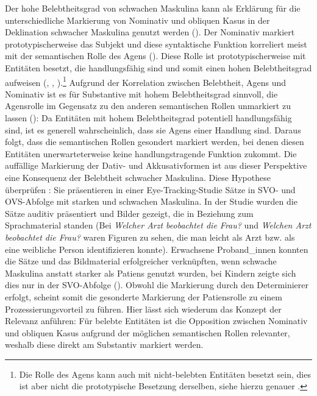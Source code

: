 Der hohe Belebtheitsgrad von schwachen Maskulina kann als Erklärung für die unterschiedliche Markierung von Nominativ und obliquen Kasus in der Deklination schwacher Maskulina genutzt werden (\cite[117--118]{Kopcke.2000}). Der Nominativ markiert prototypischerweise das Subjekt und diese syntaktische Funktion korreliert meist mit der semantischen Rolle des Agens (\cite[118]{Kopcke.2000}). Diese Rolle ist prototypischerweise mit Entitäten besetzt, die handlungsfähig sind und somit einen hohen Belebtheitsgrad aufweisen (\cite[248]{Langacker.1991}, \cite[16--17]{Primus.2012}, \cite[103--104]{Flick.2020}).\footnote{Die Rolle des Agens kann auch mit nicht-belebten Entitäten besetzt sein, dies ist aber nicht die prototypische Besetzung derselben, siehe hierzu genauer \textcite[114--115]{Flick.2020}.} Aufgrund der Korrelation zwischen Belebtheit, Agens und Nominativ ist es für Substantive mit hohem Belebtheitsgrad sinnvoll, die Agensrolle im Gegensatz zu den anderen semantischen Rollen unmarkiert zu lassen (\cite[118]{Kopcke.2000}): Da Entitäten mit hohem Belebtheitsgrad potentiell handlungsfähig sind, ist es generell wahrscheinlich, dass sie Agens einer Handlung sind. Daraus folgt, dass die semantischen Rollen gesondert markiert werden, bei denen diesen Entitäten unerwarteterweise keine handlungstragende Funktion zukommt. Die auffällige Markierung der Dativ- und Akkusativformen ist aus dieser Perspektive eine Konsequenz der Belebtheit schwacher Maskulina. Diese Hypothese überprüfen \textcite{Binanzer.2020b}: Sie präsentieren in einer Eye-Tracking-Studie Sätze in SVO- und OVS-Abfolge mit starken und schwachen Maskulina. In der Studie wurden die Sätze auditiv präsentiert und Bilder gezeigt, die in Beziehung zum Sprachmaterial standen (Bei \textit{Welcher Arzt beobachtet die Frau?} und \textit{Welchen Arzt beobachtet die Frau?} waren Figuren zu sehen, die man leicht als Arzt bzw. als eine weibliche Person identifizieren konnte). Erwachsene Proband\_innen konnten die Sätze und das Bildmaterial erfolgreicher verknüpften, wenn schwache Maskulina anstatt starker als Patiens genutzt wurden, bei Kindern zeigte sich dies nur in der SVO-Abfolge (\cite[399]{Binanzer.2020b}). Obwohl die Markierung durch den Determinierer erfolgt, scheint somit die gesonderte Markierung der Patiensrolle zu einem Prozessierungsvorteil zu führen. Hier lässt sich wiederum das Konzept der Relevanz anführen: Für belebte Entitäten ist die Opposition zwischen Nominativ und obliquen Kasus aufgrund der möglichen semantischen Rollen relevanter, weshalb diese direkt am Substantiv markiert werden.

